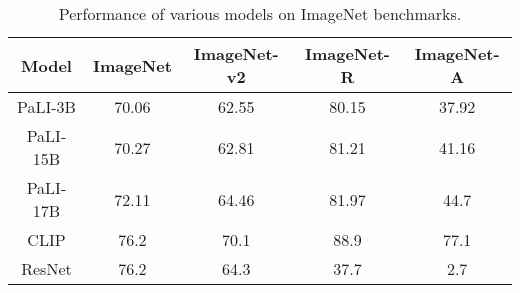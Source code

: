 \begin{table}
\centering
\scriptsize
\begin{tabular}{c c c c c}
\hline
\textbf{Model} & \textbf{ImageNet} & \textbf{ImageNet-v2} & \textbf{ImageNet-R} & \textbf{ImageNet-A} \\
\hline
PaLI-3B & 70.06 & 62.55 & 80.15 & 37.92 \\

PaLI-15B & 70.27 & 62.81 & 81.21 & 41.16 \\

PaLI-17B & 72.11 & 64.46 & 81.97 & 44.7 \\

CLIP & 76.2 & 70.1 & 88.9 & 77.1 \\

ResNet & 76.2 & 64.3 & 37.7 & 2.7 \\
\hline
\end{tabular}
\caption{Performance of various models on ImageNet benchmarks.}
\label{tab:imagenet_results}
\end{table}